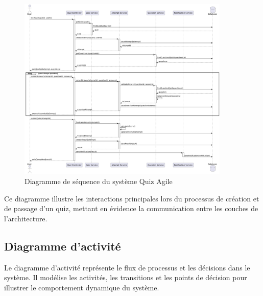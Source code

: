 \documentclass[12pt,a4paper]{report}
\begin{document}
\begin{figure}[H]
\centering
\includegraphics[width=0.9\textwidth]{latex_media/media/image19.png}
\caption{Diagramme de séquence du système Quiz Agile}
\label{fig:diagramme-sequence}
\end{figure}

Ce diagramme illustre les interactions principales lors du processus de création et de passage d'un quiz, mettant en évidence la communication entre les couches de l'architecture.

\subsection{Diagramme d'activité}

Le diagramme d'activité représente le flux de processus et les décisions dans le système. Il modélise les activités, les transitions et les points de décision pour illustrer le comportement dynamique du système.
\end{document}
